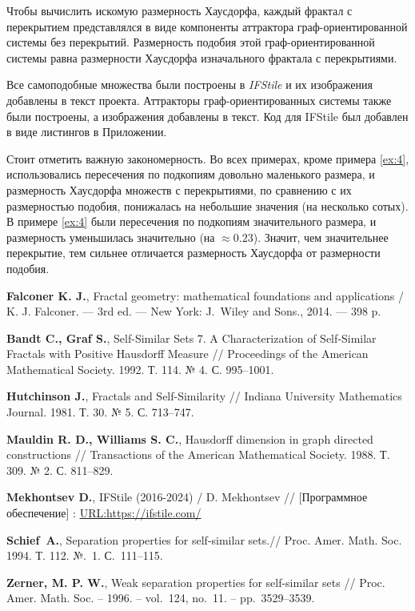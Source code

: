 \documentclass[a4paper,14pt]{extarticle} %
\newcommand{\0}{\varnothing}
\newcommand{\8}{\infty}
\theoremstyle{definition}
\begin{document}
Чтобы вычислить искомую размерность Хаусдорфа, каждый фрактал с перекрытием представлялся в виде компоненты аттрактора граф-ориентированной системы без перекрытий.
Размерность подобия этой граф-ориентированной системы равна размерности Хаусдорфа изначального фрактала с перекрытиями.

Все самоподобные множества были построены в {\em IFStile} и их изображения добавлены в текст проекта. Аттракторы граф-ориентированных системы также были построены, а изображения добавлены в текст.
Код для IFStile был добавлен в виде листингов в Приложении.

Стоит отметить важную закономерность. 
Во всех примерах, кроме примера \ref{ex:4}, использовались пересечения по подкопиям довольно маленького размера, и размерность Хаусдорфа множеств с перекрытиями, по сравнению с их размерностью подобия, понижалась на небольшие значения (на нес\-коль\-ко сотых).
В примере \ref{ex:4} были пересечения по подкопиям значительного размера, и размерность уменьшилась значительно (на $\approx0.23$).
Значит, чем значительнее перекрытие, тем сильнее отличается размерность Хаусдорфа от размерности подобия.


\newpage
{} %
\begin{thebibliography}{9}
{\bf Falconer K. J.},
Fractal geometry: mathematical foundations and applications / 
K. J. Falconer. --- 3rd ed. --- New York: J.~Wiley and Sons., 2014. --- 398 p.

{\bf Bandt C., Graf S.},
Self-Similar Sets 7. A Characterization of Self-Similar Fractals with Positive Hausdorff Measure // 
Proceedings of the American Mathematical Society. 1992. Т. 114. № 4. С. 995--1001.

{\bf Hutchinson J.},
Fractals and Self-Similarity // 
Indiana University Mathematics Journal. 1981. Т. 30. № 5. С. 713--747.
    
{\bf Mauldin R. D., Williams S. C.},
Hausdorff dimension in graph directed constructions // 
Transactions of the American Mathematical Society. 1988. Т. 309. № 2. С. 811--829.
    
{\bf Mekhontsev D.}, 
IFStile (2016-2024) / D. Mekhontsev // [Программное обеспечение] : 
\href{https://ifstile.com/}{URL:https://ifstile.com/} 

{\bf Schief~A.},  Separation properties for self-similar sets.// 
Proc. Amer. Math. Soc. 1994. Т. 112. №.~1. С.~111--115.

{\bf Zerner, M. P. W.},
Weak separation properties for self-similar sets // 
Proc. Amer. Math. Soc.  -- 1996. -- vol.~124, no.~11. -- pp.~3529--3539.   
    
\end{thebibliography}
\end{document}
